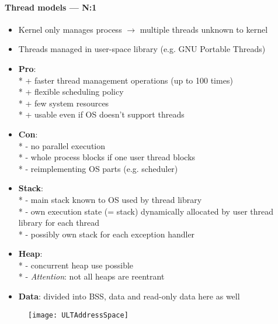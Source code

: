 \paragraph{Thread models --- N:1}
\begin{itemize}
  \item Kernel only manages process \( \to \) multiple threads unknown to kernel 
  \item Threads managed in user-space library (e.g. GNU Portable Threads)
  \item \textbf{Pro}: \\*
    + faster thread management operations (up to 100 times) \\*
    + flexible scheduling policy \\*
    + few system resources \\*
    + usable even if OS doesn't support threads
  \item \textbf{Con}: \\*
    - no parallel execution \\*
    - whole process blocks if one user thread blocks \\*
    - reimplementing OS parts (e.g. scheduler)
  \item \textbf{Stack}: \\*
    - main stack known to OS used by thread library \\*
    - own execution state (= stack) dynamically allocated by user thread library for each thread \\*
    - possibly own stack for each exception handler
  \item \textbf{Heap}: \\*
    - concurrent heap use possible \\*
    - \emph{Attention}: not all heaps are reentrant
  \item \textbf{Data}: divided into BSS, data and read-only data here as well
\end{itemize}
\begin{figure}[h]\centering\label{ULTAddressSpace}\texttt{[image: ULTAddressSpace]}\end{figure}

